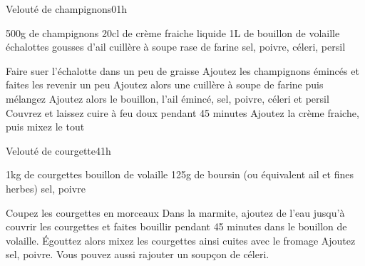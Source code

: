 \begin{recette}{Velouté de champignons}{0}{1h}{}
\begin{ingredients}
\ingredient 500g de champignons
\ingredient 20cl de crème fraiche liquide
\ingredient 1L de bouillon de volaille
 échalottes
 gousses d'ail
 cuillère à soupe rase de farine
\ingredient sel, poivre, céleri, persil
\end{ingredients}

\begin{preparation}
\etape Faire suer l'échalotte dans un peu de graisse
\etape Ajoutez les champignons émincés et faites les revenir un peu
\etape Ajoutez alors une cuillère à soupe de farine puis mélangez
\etape Ajoutez alors le bouillon, l'ail émincé, sel, poivre, céleri et persil
\etape Couvrez et laissez cuire à feu doux pendant 45 minutes
\etape Ajoutez la crème fraiche, puis mixez le tout
\end{preparation}
\end{recette}

\begin{recette}{Velouté de courgette}{4}{1h}{}
\begin{ingredients}
\ingredient 1kg de courgettes
\ingredient bouillon de volaille
\ingredient 125g de boursin (ou équivalent ail et fines herbes)
\ingredient sel, poivre
\end{ingredients}

\begin{preparation}
\etape Coupez les courgettes en morceaux 
\etape Dans la marmite, ajoutez de l'eau jusqu'à couvrir les courgettes et faites bouillir pendant 45 minutes dans le bouillon
de volaille. 
\etape Égouttez alors mixez les courgettes ainsi cuites avec le fromage
\etape Ajoutez sel, poivre. Vous pouvez aussi rajouter un soupçon de céleri.
\end{preparation}
\end{recette}
